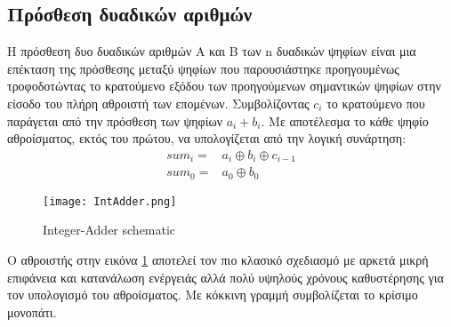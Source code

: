 % 
\subsection{Πρόσθεση δυαδικών αριθμών}

Η πρόσθεση δυο δυαδικών αριθμών A και Β των n δυαδικών ψηφίων είναι 
μια επέκταση της πρόσθεσης μεταξύ ψηφίων που παρουσιάστηκε προηγουμένως τροφοδοτώντας 
το κρατούμενο εξόδου των προηγούμενων σημαντικών ψηφίων στην είσοδο του πλήρη αθροιστή 
των επομένων. Συμβολίζοντας $c_{i}$ το κρατούμενο που παράγεται από την πρόσθεση των ψηφίων 
$a_i+b_i$. Με αποτέλεσμα το κάθε ψηφίο αθροίσματος, εκτός του πρώτου, να υπολογίζεται από την 
λογική συνάρτηση:
\begin{equation}
\begin{split}
    sum_i =& a_i \oplus b_i \oplus c_{i-1}\\
    sum_0 =& a_0 \oplus b_0    
\end{split}
\end{equation}

\begin{figure}[H]
\centering
\texttt{[image: IntAdder.png]}
\caption{Integer-Adder schematic}
\label{IntegerAdderSchematic}
\end{figure}
Ο αθροιστής στην εικόνα \ref{IntegerAdderSchematic} αποτελεί τον πιο κλασικό σχεδιασμό 
με αρκετά μικρή επιφάνεια και κατανάλωση ενέργειάς αλλά πολύ υψηλούς χρόνους καθυστέρησης 
για τον υπολογισμό του αθροίσματος.
Με κόκκινη γραμμή συμβολίζεται το κρίσιμο μονοπάτι. 



